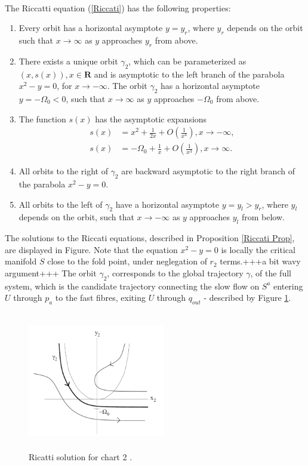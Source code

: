 \begin{prop}\label{Riccati Prop} \\
The Riccatti equation (\ref{Riccati}) has the following properties:
\begin{enumerate}
\item Every orbit has a horizontal asymptote $y=y_r$, where $y_r$ depends on the orbit such that $x \to \infty$ as $y$ approaches $y_r$ from above.
\item There exists a unique orbit $\gamma_2$, which can be parameterized as $(x,s(x)), x \in \mathbf{R}$ and is asymptotic to the left branch of the parabola $x^2 - y = 0$, for $x \to - \infty$. The orbit $\gamma_2$ has a horizontal asymptote $y= - \Omega_0 <0$, such that $x \to \infty$ as $y$ approaches $-\Omega_0$ from above.
\item The function $s(x)$ has the asymptotic expansions
\begin{align*}
s(x) &= x^2 + \frac{1}{2x} + O\left( \frac{1}{x^4} \right), x \to -\infty,\\
s(x) &= -\Omega_0 + \frac{1}{x} + O\left( \frac{1}{x^3} \right), x \to \infty.
\end{align*}
\item All orbits to the right of $\gamma_2$  are backward asymptotic to the right branch of the parabola $x^2-y=0$.
\item All orbits to the left of $\gamma_2$ have a horizontal asymptote $y=y_l>y_r$, where $y_l$ depends on the orbit, such that $x \to -\infty$ as $y$ approaches $y_l$ from below.
\end{enumerate}
\end{prop}

The solutions to the Riccati equations, described in Proposition \ref{Riccati Prop}, are displayed in Figure. Note that the equation $x^2 - y=0$ is locally the critical manifold $S$ close to the fold point, under neglegation of $r_2$ terms.+++a bit wavy argument+++
The orbit $\gamma_2$, corresponds to the global trajectory $\gamma$, of the full system, which is the candidate trajectory connecting the slow flow on $S^a$ entering $U$ through $p_a$ to the fast fibres, exiting $U$ through $q_{out}$ - described by Figure \ref{fig: Ricatti Sol}. 
\begin{figure}[h!]\centering
	\includegraphics[height=6cm,width=6cm]{Images/Dynamics_in_K2}
	\caption{Ricatti solution for chart 2 \citep{krupa2001}.}
	\label{fig: Ricatti Sol}
\end{figure}\newpage
 
